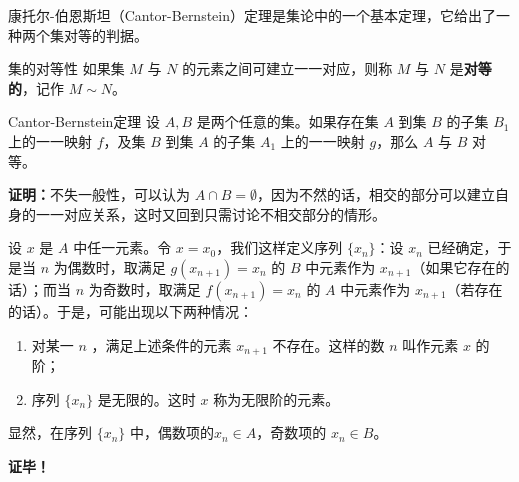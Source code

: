 康托尔-伯恩斯坦（Cantor-Bernstein）定理是集论中的一个基本定理，它给出了一种两个集对等的判据。
\begin{definition}{集的对等性}
如果集 $M$ 与 $N$ 的元素之间可建立一一对应，则称 $M$ 与 $N$ 是\textbf{对等的}，记作 $M\sim N$。
\end{definition}
\begin{theorem}{Cantor-Bernstein定理}
设 $A,B$ 是两个任意的集。如果存在集 $A$ 到集 $B$ 的子集 $B_1$ 上的一一映射 $f$，及集 $B$ 到集 $A$ 的子集 $A_1$ 上的一一映射 $g$，那么 $A$ 与 $B$ 对等。
\end{theorem}
\textbf{证明：}不失一般性，可以认为 $A\cap B=\emptyset$，因为不然的话，相交的部分可以建立自身的一一对应关系，这时又回到只需讨论不相交部分的情形。

设 $x$ 是 $A$ 中任一元素。令 $x=x_0$，我们这样定义序列 $\{x_n\}$：设 $x_n$ 已经确定，于是当 $n$ 为偶数时，取满足 $g(x_{n+1})=x_n$ 的 $B$ 中元素作为 $x_{n+1}$（如果它存在的话）；而当 $n$ 为奇数时，取满足 $f(x_{n+1})=x_n$ 的 $A$ 中元素作为 $x_{n+1}$（若存在的话）。于是，可能出现以下两种情况：
\begin{enumerate}
\item 对某一 $n$ ，满足上述条件的元素 $x_{n+1}$ 不存在。这样的数 $n$ 叫作元素 $x$ 的阶；
\item 序列 $\{x_n\}$ 是无限的。这时 $x$ 称为无限阶的元素。
\end{enumerate}
显然，在序列 $\{x_n\}$ 中，偶数项的$x_n\in A$，奇数项的 $x_n\in B$。


\textbf{证毕！}
